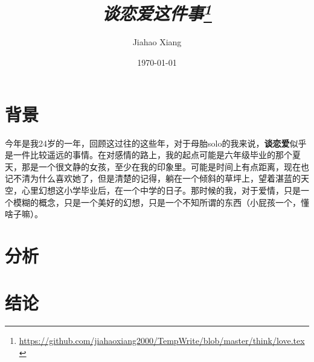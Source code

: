 \documentclass{article}
\title{\textit{谈恋爱这件事\footnote{\href{https://github.com/jiahaoxiang2000/TempWrite/blob/master/think/love.tex}{https://github.com/jiahaoxiang2000/TempWrite/blob/master/think/love.tex}}}}
\author{Jiahao Xiang}
\date{\today}
\begin{document}
\maketitle

\section{背景}
今年是我24岁的一年，回顾这过往的这些年，对于母胎solo的我来说，\textbf{谈恋爱}似乎是一件比较遥远的事情。在对感情的路上，我的起点可能是六年级毕业的那个夏天，那是一个很文静的女孩，至少在我的印象里。可能是时间上有点距离，现在也记不清为什么喜欢她了，但是清楚的记得，躺在一个倾斜的草坪上，望着湛蓝的天空，心里幻想这小学毕业后，在一个中学的日子。那时候的我，对于爱情，只是一个模糊的概念，只是一个美好的幻想，只是一个不知所谓的东西（小屁孩一个，懂啥子嘛）。



\section{分析}


\section{结论}
\end{document}
